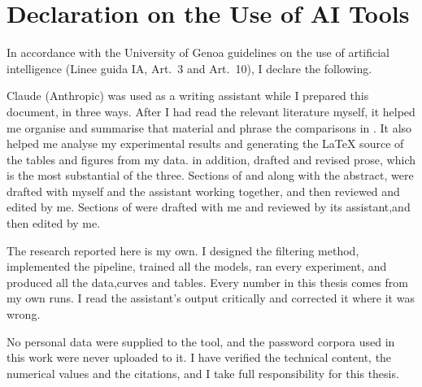 \documentclass{masterthesis_ceng}
\begin{document}
\chapter*{Declaration on the Use of AI Tools}

In accordance with the University of Genoa guidelines on the use of
artificial intelligence (Linee guida IA, Art.~3 and Art.~10), I declare
the following.

Claude (Anthropic) was used as a writing assistant while I prepared this
document, in three ways. After I had read the relevant literature
myself, it helped me organise and summarise that material and phrase the
comparisons in . It also helped me analyse my experimental
results and generating the \LaTeX{} source of the tables and figures from my data. 
in addition, drafted and revised prose, which is the most substantial of the three.
Sections of  and  along with the abstract,
were drafted with myself and the assistant working together, and then reviewed and 
edited by me. Sections of  were drafted with me and reviewed by
its assistant,and then edited by me. 

The research reported here is my own. I designed the filtering method,
implemented the pipeline, trained all the models, ran every experiment,
and produced all the data,curves and tables. Every number in this thesis comes from my own
runs. I read the assistant's output critically and corrected it where it
was wrong.

No personal data were supplied to the tool, and the password corpora
used in this work were never uploaded to it. I have verified the
technical content, the numerical values and the citations, and I take
full responsibility for this thesis.


\tableofcontents













\printbibliography
% 
% 
\end{document}
